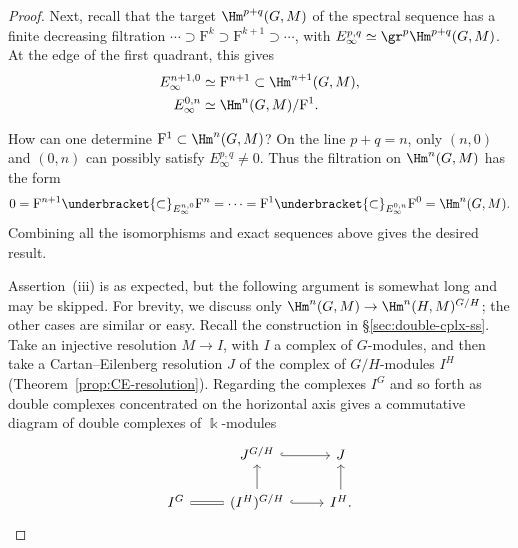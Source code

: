 \begin{proof}
	Next, recall that the target $\Hm^{p+q}(G,M)$ of the spectral sequence has
	a finite decreasing filtration
	$\cdots\supset\mathrm{F}^k\supset\mathrm{F}^{k+1}\supset\cdots$, with
	$E_\infty^{p,q}\simeq\gr^p\Hm^{p+q}(G,M)$. At the edge of the first
	quadrant, this gives
	\begin{align*}
		E_\infty^{n+1,0}&\simeq\mathrm{F}^{n+1}
		\subset\Hm^{n+1}(G,M),\\
		E_\infty^{0,n}&\simeq\Hm^n(G,M)/\mathrm{F}^1.
	\end{align*}

	How can one determine $\mathrm{F}^1\subset\Hm^n(G,M)$? On the line
	$p+q=n$, only $(n,0)$ and $(0,n)$ can possibly satisfy
	$E_\infty^{p,q}\neq0$. Thus the filtration on $\Hm^n(G,M)$ has the form
	\[ 0=\mathrm{F}^{n+1}
	\underbracket{\subset}_{E_\infty^{n,0}}\mathrm{F}^n
	=\cdots=\mathrm{F}^1
	\underbracket{\subset}_{E_\infty^{0,n}}\mathrm{F}^0
	=\Hm^n(G,M). \]
	Combining all the isomorphisms and exact sequences above gives the desired
	result.

	Assertion~(iii) is as expected, but the following argument is somewhat
	long and may be skipped. For brevity, we discuss only
	$\Hm^n(G,M)\to\Hm^n(H,M)^{G/H}$; the other cases are similar or easy.
	Recall the construction in \S\ref{sec:double-cplx-ss}. Take an injective
	resolution $M\to I$, with $I$ a complex of $G$-modules, and then take a
	Cartan--Eilenberg resolution $J$ of the complex of $G/H$-modules $I^H$
	(Theorem~\ref{prop:CE-resolution}). Regarding the complexes $I^G$ and so
	forth as double complexes concentrated on the horizontal axis gives a
	commutative diagram of double complexes of $\Bbbk$-modules
	\begin{equation}\label{eqn:LHS-SS-aux}\begin{tikzcd}
		& J^{G/H} \arrow[hookrightarrow,r] & J \\
		I^G \arrow[equal,r] & (I^H)^{G/H}
		\arrow[hookrightarrow,r] \arrow[u] & I^H. \arrow[u]
	\end{tikzcd}\end{equation}


\end{proof}
